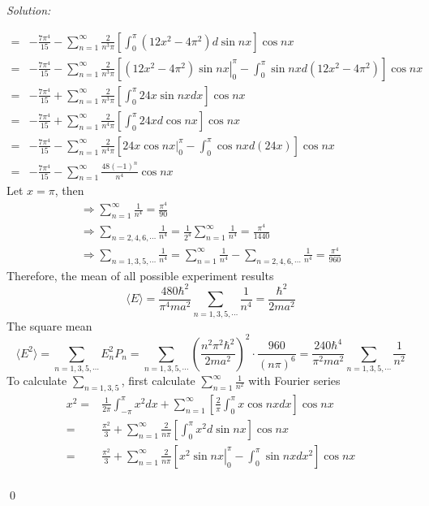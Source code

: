 \documentclass[12pt,a4paper]{article}
\newenvironment{sol}
    {\emph{Solution:}
    }
    {
    \qed
    }
\begin{document}
\begin{sol}
\begin{itemize}
\begin{align}
\nonumber=&-\frac{7\pi^4}{15}-\sum_{n=1}^{\infty}\frac{2}{n^3\pi}\left[\int_0^{\pi}(12x^2-4\pi^2)d\sin nx\right]\cos nx\\
\nonumber=&-\frac{7\pi^4}{15}-\sum_{n=1}^{\infty}\frac{2}{n^3\pi}\left[\left.(12x^2-4\pi^2)\sin nx\right|_0^{\pi}-\int_0^{\pi}\sin nxd(12x^2-4\pi^2)\right]\cos nx\\
\nonumber=&-\frac{7\pi^4}{15}+\sum_{n=1}^{\infty}\frac{2}{n^3\pi}\left[\int_0^{\pi}24x\sin nxdx\right]\cos nx\\
\nonumber=&-\frac{7\pi^4}{15}+\sum_{n=1}^{\infty}\frac{2}{n^4\pi}\left[\int_0^{\pi}24xd\cos nx\right]\cos nx\\
\nonumber=&-\frac{7\pi^4}{15}-\sum_{n=1}^{\infty}\frac{2}{n^4\pi}\left[\left.24x\cos nx\right|_0^{\pi}-\int_0^{\pi}\cos nxd(24x)\right]\cos nx\\
=&-\frac{7\pi^4}{15}-\sum_{n=1}^{\infty}\frac{48(-1)^n}{n^4}\cos nx
\end{align}
Let $x=\pi$, then
\begin{gather}
\Longrightarrow\sum_{n=1}^{\infty}\frac{1}{n^4}=\frac{\pi^4}{90}\\
\Longrightarrow\sum_{n=2,4,6,\cdots}\frac{1}{n^4}=\frac{1}{2^4}\sum_{n=1}^{\infty}\frac{1}{n^4}=\frac{\pi^4}{1440}\\
\Longrightarrow\sum_{n=1,3,5,\cdots}\frac{1}{n^4}=\sum_{n=1}^{\infty}\frac{1}{n^4}-\sum_{n=2,4,6,\cdots}\frac{1}{n^4}=\frac{\pi^4}{960}
\end{gather}
Therefore, the mean of all possible experiment results
\begin{equation}
\langle E\rangle=\frac{480\hbar^2}{\pi^4ma^2}\sum_{n=1,3,5,\cdots}\frac{1}{n^4}=\frac{\hbar^2}{2ma^2}
\end{equation}
The square mean
\begin{equation}
\langle E^2\rangle=\sum_{n=1,3,5,\cdots}E_n^2P_n=\sum_{n=1,3,5,\cdots}\left(\frac{n^2\pi^2\hbar^2}{2ma^2}\right)^2\cdot\frac{960}{(n\pi)^6}=\frac{240\hbar^4}{\pi^2ma^2}\sum_{n=1,3,5,\cdots}\frac{1}{n^2}
\end{equation}
To calculate $\sum_{n=1,3,5}$, first calculate $\sum_{n=1}^{\infty}\frac{1}{n^2}$ with Fourier series
\begin{align}
\nonumber x^2=&\frac{1}{2\pi}\int_{-\pi}^{\pi}x^2dx+\sum_{n=1}^{\infty}\left[\frac{2}{\pi}\int_0^{\pi}x\cos nxdx\right]\cos nx\\
\nonumber=&\frac{\pi^2}{3}+\sum_{n=1}^{\infty}\frac{2}{n\pi}\left[\int_0^{\pi}x^2d\sin nx\right]\cos nx\\
\nonumber=&\frac{\pi^2}{3}+\sum_{n=1}^{\infty}\frac{2}{n\pi}\left[\left.x^2\sin nx\right|_0^{\pi}-\int_0^{\pi}\sin nxdx^2\right]\cos nx\\

\end{align}
\end{itemize}
\end{sol}
\end{document}

